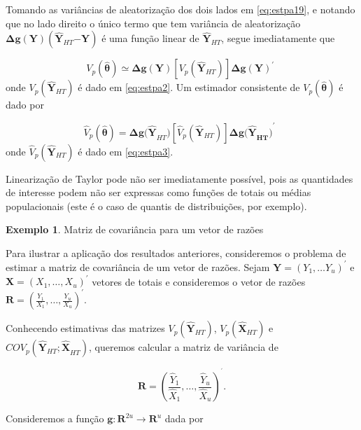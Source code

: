 \documentclass[
  12pt,
  brazilian,
]{book}
\theoremstyle{definition}
\theoremstyle{definition}
\newtheorem{example}{Exemplo}[chapter]
\theoremstyle{definition}
\theoremstyle{definition}
\theoremstyle{remark}
\begin{document}
Tomando as variâncias de aleatorização dos dois lados em \eqref{eq:estpa19}, e notando que no lado direito o único termo que tem variância de aleatorização
\(\mathbf{\Delta g(Y)}\left( \mathbf{\widehat{Y}}_{HT}\mathbf{-Y}\right)\) é uma função linear de \(\mathbf{\widehat{Y}}_{HT}\), segue imediatamente que

\[
V_{p} \left( \mathbf{\widehat{\theta}} \right) \mathbf{\simeq \Delta g(Y)} \left[
V_{p} \left( \mathbf{\hat{Y}}_{HT} \right) \right] \mathbf{\Delta g(Y)}^{\prime}
\,\, \label{eq:estpa20}
\]
onde \(V_{p} \left( \mathbf{\widehat{Y}}_{HT}\right)\) é dado em \eqref{eq:estpa2}. Um estimador consistente de \(V_{p} \left( \mathbf{\widehat{\theta}}\right)\) é dado por

\[
\hat{V}_{p} \left( \mathbf{\widehat{\theta}} \right) = \mathbf{\Delta g( \widehat{Y} }_{HT} \mathbf{)} \left[ \widehat{V}_{p} \left( \mathbf{\widehat{Y}}_{HT} \right) \right] \mathbf{\Delta g\mathbf{(\widehat{Y}}_{HT} \mathbf{)}}^{\prime} \,\,\,  \label{eq:estpa21}
\]
onde \(\widehat{V}_{p}\left( \mathbf{\widehat{Y}}_{HT}\right)\) é dado em \eqref{eq:estpa3}.

Linearização de Taylor pode não ser imediatamente possível, pois as quantidades de interesse podem não ser expressas como funções de totais ou médias populacionais (este é o caso de quantis de distribuições, por exemplo).

\begin{example}
\protect\hypertarget{exm:exe32}{}{\label{exm:exe32} }Matriz de covariância para um vetor de razões
\end{example}

Para ilustrar a aplicação dos resultados anteriores, consideremos o problema de estimar a matriz de covariância de um vetor de razões. Sejam \(\mathbf{Y}=\left( Y_{1},\ldots Y_{u}\right) ^{\prime }\) e \(\mathbf{X}=\left( X_{1},\ldots, X_{u}\right) ^{\prime }\) vetores de totais e consideremos o vetor de razões \(\mathbf{R=} \left( \frac{Y_{1}}{X_{1}},\ldots ,\frac{Y_{u}}{X_{u}}\right) ^{\prime }.\)

Conhecendo estimativas das matrizes \(V_{p}\left( \mathbf{\hat{Y}}_{HT}\right)\), \(V_{p}\left( \mathbf{\hat{X}}_{HT}\right)\) e \(COV_{p}\left( \mathbf{\hat{Y}}_{HT} \mathbf{;\hat{X}}_{HT}\right)\), queremos calcular a matriz de variância de

\[
\widehat{\mathbf{R}}\mathbf{=}\left( \frac{\hat{Y}_{1}}{\hat{X}_{1}},\ldots ,\frac{\hat{Y}_{u}}{\hat{X}_{u}}\right) ^{^{\prime }}. 
\]

Consideremos a função \(\mathbf{g}:\textbf{R}^{2u}\rightarrow \textbf{R}^{u}\) dada por
\end{document}
